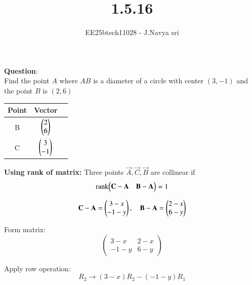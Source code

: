 \documentclass[journal]{IEEEtran}
\begin{document}

\vspace{3cm}

\title{1.5.16}
\author{EE25btech11028 - J.Navya sri}
{\let\newpage\relax\maketitle}

\renewcommand{\thefigure}{\theenumi}
\renewcommand{\thetable}{\theenumi}
\setlength{\intextsep}{10pt} %


\renewcommand{\thetable}{\theenumi}


\textbf{Question}:\\
 Find the point $A$ where $AB$ is a diameter of a circle with center $(3,-1)$ and the point $B$ is $(2,6)$

\bigskip

\begin{tabular}[12pt]{ |c| c| c|} 
    \hline
    {Point} & {Vector} \\ 
    \hline
    B & $ \begin{pmatrix}2 \\ 6\end{pmatrix} $  \\
    \hline
    C & $ \begin{pmatrix}3 \\ -1\end{pmatrix} $   \\
    \hline  
\end{tabular}

\bigskip

\textbf{Using rank of matrix:}
\bigskip
Three points \( \vec{A}, \vec{C}, \vec{B} \) are collinear if
\[
\text{rank}{\begin{pmatrix} \mathbf{C} - \mathbf{A} & \mathbf{B} - \mathbf{A} \end{pmatrix}} = 1
\]

\[
\mathbf{C} - \mathbf{A} = \begin{pmatrix}3 - x\\ -1 - y\end{pmatrix}, \quad
\mathbf{B} - \mathbf{A} = \begin{pmatrix}2 - x\\ 6 - y\end{pmatrix}
\]

Form matrix:
\[
\begin{pmatrix}
3 - x & 2 - x \\
-1 - y & 6 - y
\end{pmatrix}
\]

Apply row operation:
\[
R_2 \rightarrow (3 - x)R_2 - (-1 - y)R_1
\]
\end{document}
